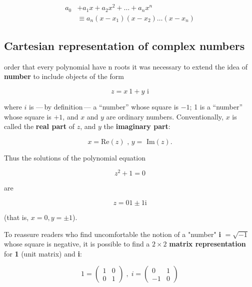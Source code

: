 \begin{equation}
  \begin{aligned}
    a_0 & + a_1x + a_2x^2 + \ldots + a_nx^n \\
    & \equiv a_n(x-x_1)(x-x_2) \ldots (x-x_n)
  \end{aligned}
\end{equation}

\subsection{Cartesian representation of complex numbers}
 order that every polynomial have n roots it was necessary to extend the idea of \textbf{number} to include objects of the form

\begin{equation}
  z = x\ 1 + y\text{ i}
\end{equation}

where $i$ is ---\,by definition\,--- a ``number'' whose square is $-1$; 1 is a ``number'' whose square is $+1$, and $x$ and $y$ are ordinary numbers. Conventionally, $x$ is called the \textbf{real part} of $z$, and $y$ the \textbf{imaginary part}:

\begin{equation}
  x = \text{Re$(z)$ , $y =$ Im$(z)$.}
\end{equation}

Thus the solutions of the polynomial equation

\begin{equation}
  z^2 + 1 = 0
\end{equation}

are

\begin{equation}
  z = 01 \pm 1\text{i}
\end{equation}

(that is, $x = 0, y = \pm1$).

To reassure readers who find uncomfortable the notion of a "number" \textbf{i} $= \sqrt{-1}$ whose square is negative, it is possible to find a $2\times2$ \textbf{matrix representation} for \textbf{1} (unit matrix) and \textbf{i}:

\begin{equation}
  1 =
  \begin{pmatrix}
    1 & 0 \\ 0 & 1
  \end{pmatrix}
  \; , \; i =
  \begin{pmatrix}
    0 & 1 \\ -1 & 0
  \end{pmatrix}
\end{equation}

